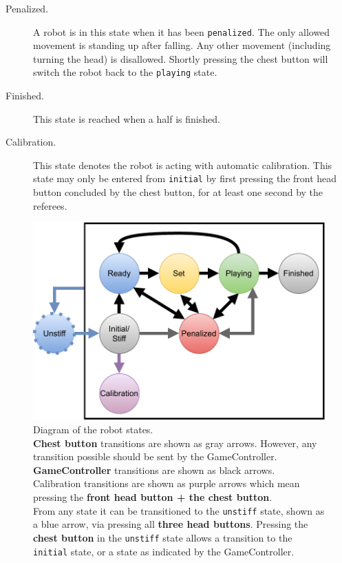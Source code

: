 \begin{description}
  \item[Penalized.] A robot is in this state when it has been \texttt{penalized}.
    The only allowed movement is standing up after falling.
    Any other movement (including turning the head) is disallowed.
    Shortly pressing the chest button will switch the robot back to the \texttt{playing} state.

  \item[Finished.] This state is reached when a half is finished.

  \item[Calibration.] This state denotes the robot is acting with automatic calibration.
    This state may only be entered from \texttt{initial} by first pressing the front head button concluded by the chest button, for at least one second by the referees.
\end{description}

\begin{figure}[t]
  \centerline{\includegraphics[width=0.9\columnwidth]{figs/states_new.pdf}}
  \caption{Diagram of the robot states.
    \\\textbf{Chest button} transitions are shown as gray arrows.
    However, any transition possible should be sent by the GameController.
    \\\textbf{GameController} transitions are shown as black arrows.
    \\Calibration transitions are shown as purple arrows which mean pressing the \textbf{front head button + the chest button}.
    \\From any state it can be transitioned to the \texttt{unstiff} state, shown as a blue arrow, via pressing all \textbf{three head buttons}.
    Pressing the \textbf{chest button} in the \texttt{unstiff} state allows a transition to the \texttt{initial} state, or a state as indicated by the GameController.}
  \label{fig:robot_states}
\end{figure}

